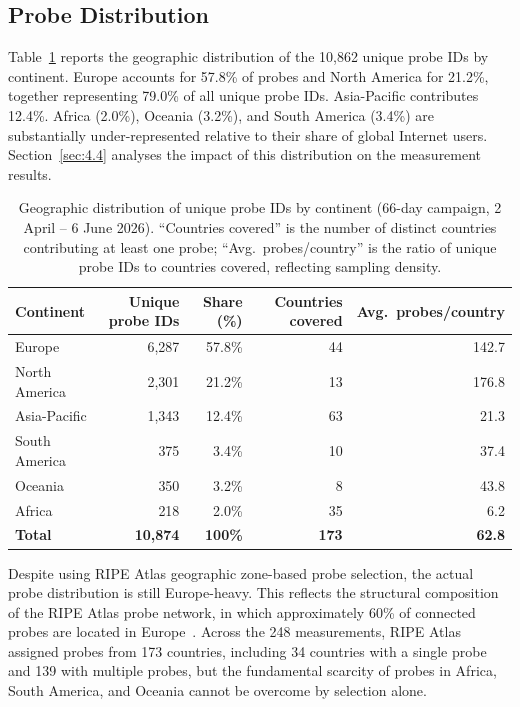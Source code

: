 \subsection{Probe Distribution}
\label{subsec:4.1.2}

Table~\ref{tab:4.2} reports the geographic distribution of the 10,862 unique probe IDs by continent. Europe accounts for 57.8\% of probes and North America for 21.2\%, together representing 79.0\% of all unique probe IDs. Asia-Pacific contributes 12.4\%. Africa (2.0\%), Oceania (3.2\%), and South America (3.4\%) are substantially under-represented relative to their share of global Internet users. Section~\ref{sec:4.4} analyses the impact of this distribution on the measurement results.

\begin{table}[H]
\centering
\small
\begin{tabular}{l r r r r}
\toprule
\textbf{Continent} & \textbf{Unique probe IDs} & \textbf{Share (\%)} & \textbf{Countries covered} & \textbf{Avg.\ probes/country} \\
\midrule
Europe          & 6,287 & 57.8\% & 44  & 142.7 \\
North America   & 2,301 & 21.2\% & 13  & 176.8 \\
Asia-Pacific    & 1,343 & 12.4\% & 63  &  21.3 \\
South America   &   375 &  3.4\% & 10  &  37.4 \\
Oceania         &   350 &  3.2\% &  8  &  43.8 \\
Africa          &   218 &  2.0\% & 35  &   6.2 \\
\textbf{Total}  & \textbf{10,874} & \textbf{100\%} & \textbf{173} & \textbf{62.8} \\
\bottomrule
\end{tabular}
\caption{Geographic distribution of unique probe IDs by continent (66-day campaign, 2 April -- 6 June 2026). ``Countries covered'' is the number of distinct countries contributing at least one probe; ``Avg.\ probes/country'' is the ratio of unique probe IDs to countries covered, reflecting sampling density.}
\label{tab:4.2}
\end{table}

Despite using RIPE Atlas geographic zone-based probe selection, the actual probe distribution is still Europe-heavy. This reflects the structural composition of the RIPE Atlas probe network, in which approximately 60\% of connected probes are located in Europe~\cite{Bajpai2017}. Across the 248 measurements, RIPE Atlas assigned probes from 173 countries, including 34 countries with a single probe and 139 with multiple probes, but the fundamental scarcity of probes in Africa, South America, and Oceania cannot be overcome by selection alone.

